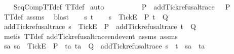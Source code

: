 \begin{isabellebody}
{%
\isadelimproof
\ \ %
\endisadelimproof
%
\isatagproof
{}\isamarkupfalse%
\ SeqCompTT{\isacharunderscore}def\ TT{}{\isacharunderscore}def\isanewline
{}\isamarkupfalse%
\ auto\isanewline
\ \ \isamarkupfalse%
\ {\isasymrho}\isanewline
\ \ \isamarkupfalse%
\ {\isachardoublequoteopen}{\isasymrho}\ {\isasymin}\ P\ {\isasymLongrightarrow}\ add{\isacharunderscore}Tick{\isacharunderscore}refusal{\isacharunderscore}trace\ {\isasymrho}\ {\isasymin}\ P{\isachardoublequoteclose}\isanewline
\ \ \ \ \isamarkupfalse%
\ TT{}{\isacharunderscore}def\ assms{\isacharparenleft}{}{\isacharparenright}\ \isamarkupfalse%
\ blast\isanewline
{}\isamarkupfalse%
\isanewline
\ \ \isamarkupfalse%
\ s\ t\isanewline
\ \ \isamarkupfalse%
\ {\isachardoublequoteopen}s\ {\isacharat}\ {\isacharbrackleft}{\isacharbrackleft}Tick{\isacharbrackright}\isactrlsub E{\isacharbrackright}\ {\isasymin}\ P{\isachardoublequoteclose}\ {\isachardoublequoteopen}t\ {\isasymin}\ Q{\isachardoublequoteclose}\isanewline
\ \ \isamarkupfalse%
\ \isamarkupfalse%
\ {\isachardoublequoteopen}add{\isacharunderscore}Tick{\isacharunderscore}refusal{\isacharunderscore}trace\ s\ {\isacharat}\ {\isacharbrackleft}{\isacharbrackleft}Tick{\isacharbrackright}\isactrlsub E{\isacharbrackright}\ {\isasymin}\ P\ {\isasymand}\ add{\isacharunderscore}Tick{\isacharunderscore}refusal{\isacharunderscore}trace\ t\ {\isasymin}\ Q{\isachardoublequoteclose}\isanewline
\ \ \ \ \isamarkupfalse%
\ {\isacharparenleft}metis\ TT{}{\isacharunderscore}def\ add{\isacharunderscore}Tick{\isacharunderscore}refusal{\isacharunderscore}trace{\isacharunderscore}end{\isacharunderscore}event\ assms{\isacharparenleft}{}{\isacharparenright}\ assms{\isacharparenleft}{}{\isacharparenright}{\isacharparenright}\isanewline
\ \ \isamarkupfalse%
\ \isamarkupfalse%
\ {\isachardoublequoteopen}{\isasymforall}sa{\isachardot}\ sa\ {\isacharat}\ {\isacharbrackleft}{\isacharbrackleft}Tick{\isacharbrackright}\isactrlsub E{\isacharbrackright}\ {\isasymin}\ P\ {\isasymlongrightarrow}\ {\isacharparenleft}{\isasymforall}ta{\isachardot}\ ta\ {\isasymin}\ Q\ {\isasymlongrightarrow}\ add{\isacharunderscore}Tick{\isacharunderscore}refusal{\isacharunderscore}trace\ {\isacharparenleft}s\ {\isacharat}\ t{\isacharparenright}\ {\isasymnoteq}\ sa\ {\isacharat}\ ta{\isacharparenright}\ {\isasymLongrightarrow}\isanewline
}
\end{isabellebody}
